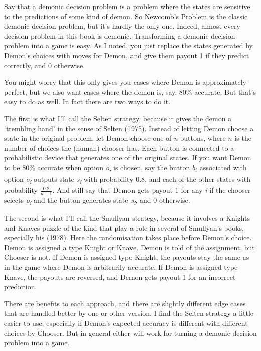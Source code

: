 \documentclass[
  12pt,
  letterpaper,
  DIV=11,
  numbers=noendperiod]{scrreprt}
\begin{document}
Say that a demonic decision problem is a problem where the states are
sensitive to the predictions of some kind of demon. So Newcomb's Problem
is the classic demonic decision problem, but it's hardly the only one.
Indeed, almost every decision problem in this book is demonic.
Transforming a demonic decision problem into a game is easy. As I noted,
you just replace the states generated by Demon's choices with moves for
Demon, and give them payout 1 if they predict correctly, and 0
otherwise.

You might worry that this only gives you cases where Demon is
approximately perfect, but we also want cases where the demon is, say,
80\% accurate. But that's easy to do as well. In fact there are two ways
to do it.

The first is what I'll call the Selten strategy, because it gives the
demon a `trembling hand' in the sense of Selten
(\protect\hyperlink{ref-Selten1975}{1975}). Instead of letting Demon
choose a state in the original problem, let Demon choose one of \emph{n}
buttons, where \(n\) is the number of choices the (human) chooser has.
Each button is connected to a probabilistic device that generates one of
the original states. If you want Demon to be 80\% accurate when option
\emph{o\textsubscript{i}} is chosen, say the button \(b_i\) associated
with option \emph{o\textsubscript{i}} outputs state
\emph{s\textsubscript{i}} with probability 0.8, and each of the other
states with probability \(\frac{0.2}{n - 1}\). And still say that Demon
gets payout 1 for any \emph{i} if the chooser selects
\emph{o\textsubscript{i}} and the button generates state
\emph{s\textsubscript{i}}, and 0 otherwise.

The second is what I'll call the Smullyan strategy, because it involves
a Knights and Knaves puzzle of the kind that play a role in several of
Smullyan's books, especially his
(\protect\hyperlink{ref-Smullyan1978}{1978}). Here the randomisation
takes place before Demon's choice. Demon is assigned a type Knight or
Knave. Demon is told of the assignment, but Chooser is not. If Demon is
assigned type Knight, the payouts stay the same as in the game where
Demon is arbitrarily accurate. If Demon is assigned type Knave, the
payouts are reversed, and Demon gets payout 1 for an incorrect
prediction.

There are benefits to each approach, and there are slightly different
edge cases that are handled better by one or other version. I find the
Selten strategy a little easier to use, especially if Demon's expected
accuracy is different with different choices by Chooser. But in general
either will work for turning a demonic decision problem into a game.
\end{document}
